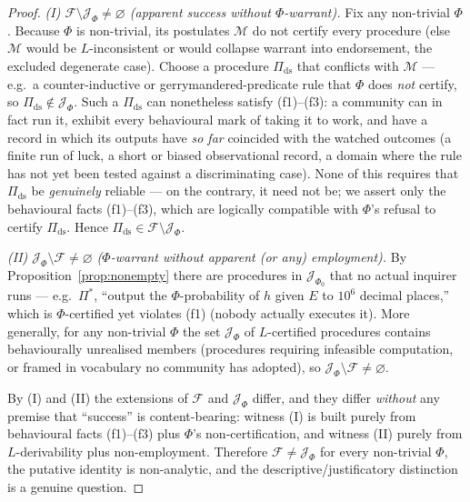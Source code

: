 \documentclass{amsart}
\theoremstyle{definition}
\theoremstyle{plain}
\theoremstyle{remark}
\begin{document}
\begin{proof}
\emph{(I) $\mathcal{F}\setminus\mathcal{J}_\Phi\neq\varnothing$ (apparent
success without $\Phi$-warrant).} Fix any non-trivial $\Phi$. Because $\Phi$ is
non-trivial, its postulates $\mathcal{M}$ do not certify every procedure (else
$\mathcal{M}$ would be $L$-inconsistent or would collapse warrant into
endorsement, the excluded degenerate case). Choose a procedure $\Pi_{\mathrm{ds}}$
that conflicts with $\mathcal{M}$ --- e.g.\ a counter-inductive or
gerrymandered-predicate rule that $\Phi$ does \emph{not} certify, so
$\Pi_{\mathrm{ds}}\notin\mathcal{J}_\Phi$. Such a $\Pi_{\mathrm{ds}}$ can
nonetheless satisfy (f1)--(f3): a community can in fact run it, exhibit every
behavioural mark of taking it to work, and have a record in which its outputs
have \emph{so far} coincided with the watched outcomes (a finite run of luck, a
short or biased observational record, a domain where the rule has not yet been
tested against a discriminating case). None of this requires that
$\Pi_{\mathrm{ds}}$ be \emph{genuinely} reliable --- on the contrary, it need
not be; we assert only the behavioural facts (f1)--(f3), which are logically
compatible with $\Phi$'s refusal to certify $\Pi_{\mathrm{ds}}$. Hence
$\Pi_{\mathrm{ds}}\in\mathcal{F}\setminus\mathcal{J}_\Phi$.

\emph{(II) $\mathcal{J}_\Phi\setminus\mathcal{F}\neq\varnothing$
($\Phi$-warrant without apparent (or any) employment).} By
Proposition~\ref{prop:nonempty} there are procedures in $\mathcal{J}_{\Phi_0}$
that no actual inquirer runs --- e.g.\ $\Pi^\ast$, ``output the $\Phi$-probability
of $h$ given $E$ to $10^{6}$ decimal places,'' which is $\Phi$-certified yet
violates (f1) (nobody actually executes it). More generally, for any non-trivial
$\Phi$ the set $\mathcal{J}_\Phi$ of $L$-certified procedures contains
behaviourally unrealised members (procedures requiring infeasible computation,
or framed in vocabulary no community has adopted), so
$\mathcal{J}_\Phi\setminus\mathcal{F}\neq\varnothing$.

By (I) and (II) the extensions of $\mathcal{F}$ and $\mathcal{J}_\Phi$ differ,
and they differ \emph{without} any premise that ``success'' is content-bearing:
witness (I) is built purely from behavioural facts (f1)--(f3) plus $\Phi$'s
non-certification, and witness (II) purely from $L$-derivability plus
non-employment. Therefore $\mathcal{F}\neq\mathcal{J}_\Phi$ for every
non-trivial $\Phi$, the putative identity is non-analytic, and the
descriptive\slash justificatory distinction is a genuine question.
\end{proof}
\end{document}
